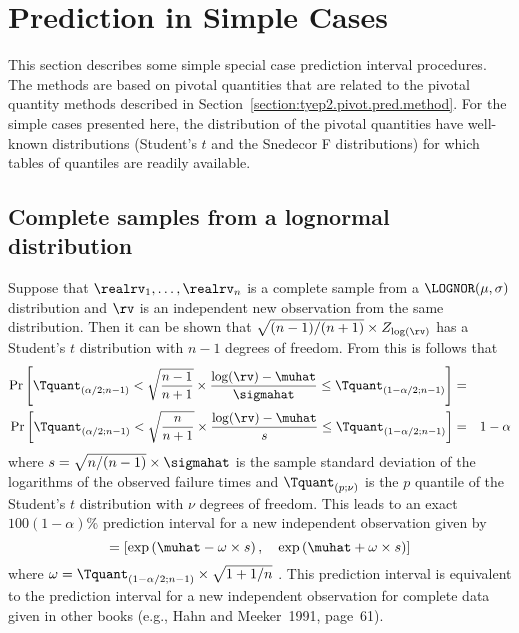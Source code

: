 \section{Prediction in Simple Cases}
\label{section:pred.simple}
This section describes some simple special case prediction interval
procedures. The methods are based on pivotal quantities
that are related to the pivotal quantity methods
described in Section~\ref{section:tyep2.pivot.pred.method}. For the
simple cases presented here, the distribution of the pivotal
quantities have well-known distributions (Student's $t$ and
the Snedecor F distributions) for which tables of quantiles are
readily available.

\subsection{Complete samples from a lognormal distribution}
Suppose that $\realrv_{1}, \dots, \realrv_{n}$ is a complete sample
from a $\LOGNOR(\mu, \sigma)$ distribution and $\rv$ is an
independent new observation from the same distribution. Then it can
be shown that $\sqrt{(n-1)/(n+1)} \times Z_{\log(\rv)}$ has a
Student's $t$ distribution with $n-1$ degrees of freedom.  From this
is follows that
\begin{eqnarray*}
\Pr \left [\Tquant_{(\alpha/2;n-1)} <
\sqrt{\frac{n-1} {n+1}}
\times \frac{	 \log(\rv) -\muhat } 
{ \sigmahat }\le\Tquant_{(1-\alpha/2;n-1)} 
\right ] &=& \\
\Pr \left [\Tquant_{(\alpha/2;n-1)} <
\sqrt{\frac{n} {n+1}}
\times \frac{	 \log(\rv) -\muhat } 
{s }\le\Tquant_{(1-\alpha/2;n-1)} 
\right ]&=&1-\alpha\\
\end{eqnarray*}
where $s=\sqrt{n/(n-1)} \times \sigmahat$ is the sample 
standard deviation of the logarithms of the 
observed failure times and $\Tquant_{(p;\nu)}$ is the $p$
quantile of the Student's $t$ distribution with $\nu$ degrees of freedom.
This leads to an exact $100(1-\alpha)\%$ prediction interval for a
new independent observation given by
\begin{displaymath}
[\Tlower, \quad \Tupper]
=\left [
\exp \left(
\muhat-
\omega
\times s
\right)
,
\quad
\exp \left(
\muhat +
\omega \times s \right) \right ]
\end{displaymath}
where $\omega = \Tquant_{(1-\alpha/2;n-1)}
     \times 
\sqrt{1+1/ n }$\,\,.
This prediction interval is equivalent to the prediction interval
for a new independent observation for complete data
given in other books (e.g., Hahn and Meeker~1991, page~61).

